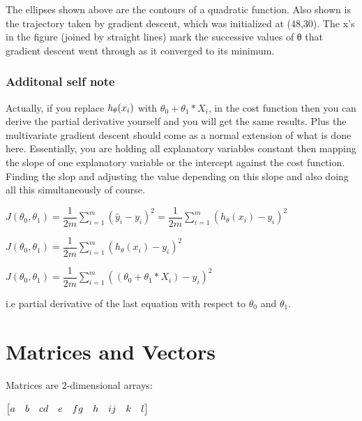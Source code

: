 \documentclass[
]{book}
\begin{document}
The ellipses shown above are the contours of a quadratic function. Also shown is the trajectory taken by gradient descent, which was initialized at (48,30). The x's in the figure (joined by straight lines) mark the successive values of θ that gradient descent went through as it converged to its minimum.

\hypertarget{additonal-self-note}{%
\subsubsection{Additonal self note}\label{additonal-self-note}}

{
Actually, if you replace \(\\h_\theta (x_i)\) with \(\theta_0 + \theta_1*X_i\), in the cost function then you can derive the partial derivative yourself and you will get the same results. Plus the multivariate gradient descent should come as a normal extension of what is done here. Essentially, you are holding all explanatory variables constant then mapping the slope of one explanatory variable or the intercept against the cost function. Finding the slop and adjusting the value depending on this slope and also doing all this simultaneously of course.
}

\(J(\theta_0, \theta_1) = \dfrac {1}{2m} \displaystyle \sum _{i=1}^m \left ( \hat{y}_{i}- y_{i} \right)^2 = \dfrac {1}{2m} \displaystyle \sum _{i=1}^m \left (h_\theta (x_{i}) - y_{i} \right)^2\)

\(J(\theta_0, \theta_1) = \dfrac {1}{2m} \displaystyle \sum _{i=1}^m \left (h_\theta (x_{i}) - y_{i} \right)^2\)

\(J(\theta_0, \theta_1) = \dfrac {1}{2m} \displaystyle \sum _{i=1}^m \left ((\theta_0 + \theta_1*X_i) - y_{i} \right)^2\)

{i.e partial derivative of the last equation with respect to \(\theta_0\) and \(\theta_1\).}

\hypertarget{matrices-and-vectors}{%
\section{Matrices and Vectors}\label{matrices-and-vectors}}

Matrices are 2-dimensional arrays:

\(\begin{bmatrix} a & b & c \newline d & e & f \newline g & h & i \newline j & k & l\end{bmatrix}\)
\end{document}
